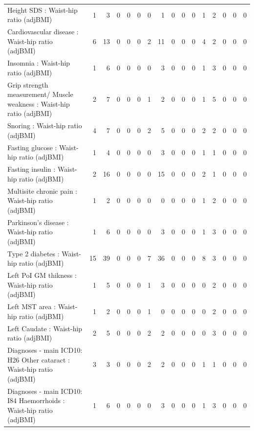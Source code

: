 \begin{table}[ht]
\begin{tabular}{lrrrrrrrrrrrrrrr}
  Height SDS : Waist-hip ratio (adjBMI) &   1 &   3 &   0 &   0 &   0 &   0 &   1 &   0 &   0 &   0 &   1 &   2 &   0 &   0 &   0 \\ 
  Cardiovascular disease : Waist-hip ratio (adjBMI) &   6 &  13 &   0 &   0 &   0 &   2 &  11 &   0 &   0 &   0 &   4 &   2 &   0 &   0 &   0 \\ 
  Insomnia : Waist-hip ratio (adjBMI) &   1 &   6 &   0 &   0 &   0 &   0 &   3 &   0 &   0 &   0 &   1 &   3 &   0 &   0 &   0 \\ 
  Grip strength measurement/ Muscle weakness : Waist-hip ratio (adjBMI) &   2 &   7 &   0 &   0 &   0 &   1 &   2 &   0 &   0 &   0 &   1 &   5 &   0 &   0 &   0 \\ 
  Snoring : Waist-hip ratio (adjBMI) &   4 &   7 &   0 &   0 &   0 &   2 &   5 &   0 &   0 &   0 &   2 &   2 &   0 &   0 &   0 \\ 
  Fasting glucose : Waist-hip ratio (adjBMI) &   1 &   4 &   0 &   0 &   0 &   0 &   3 &   0 &   0 &   0 &   1 &   1 &   0 &   0 &   0 \\ 
  Fasting insulin : Waist-hip ratio (adjBMI) &   2 &  16 &   0 &   0 &   0 &   0 &  15 &   0 &   0 &   0 &   2 &   1 &   0 &   0 &   0 \\ 
  Multisite chronic pain : Waist-hip ratio (adjBMI) &   1 &   2 &   0 &   0 &   0 &   0 &   0 &   0 &   0 &   0 &   1 &   2 &   0 &   0 &   0 \\ 
  Parkinson's disease : Waist-hip ratio (adjBMI) &   1 &   6 &   0 &   0 &   0 &   0 &   3 &   0 &   0 &   0 &   1 &   3 &   0 &   0 &   0 \\ 
  Type 2 diabetes : Waist-hip ratio (adjBMI) &  15 &  39 &   0 &   0 &   0 &   7 &  36 &   0 &   0 &   0 &   8 &   3 &   0 &   0 &   0 \\ 
  Left PoI GM thikness : Waist-hip ratio (adjBMI) &   1 &   5 &   0 &   0 &   0 &   1 &   3 &   0 &   0 &   0 &   0 &   2 &   0 &   0 &   0 \\ 
  Left MST area : Waist-hip ratio (adjBMI) &   1 &   2 &   0 &   0 &   0 &   1 &   0 &   0 &   0 &   0 &   0 &   2 &   0 &   0 &   0 \\ 
  Left Caudate : Waist-hip ratio (adjBMI) &   2 &   5 &   0 &   0 &   0 &   2 &   2 &   0 &   0 &   0 &   0 &   3 &   0 &   0 &   0 \\ 
  Diagnoses - main ICD10: H26 Other cataract : Waist-hip ratio (adjBMI) &   3 &   3 &   0 &   0 &   0 &   2 &   2 &   0 &   0 &   0 &   1 &   1 &   0 &   0 &   0 \\ 
  Diagnoses - main ICD10: I84 Haemorrhoids : Waist-hip ratio (adjBMI) &   1 &   6 &   0 &   0 &   0 &   0 &   3 &   0 &   0 &   0 &   1 &   3 &   0 &   0 &   0 \\ 

\end{tabular}
\end{table}
